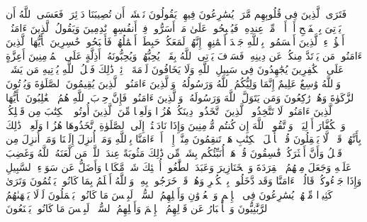 \stopbuffer%
\startbuffer[\q:5:52]
فَتَرَى ٱلَّذِینَ فِی قُلُوبِهِم مَّرَضࣱ یُسَٰرِعُونَ فِیهِمۡ یَقُولُونَ نَخۡشَىٰۤ أَن تُصِیبَنَا دَاۤئِرَةࣱۚ فَعَسَى ٱللَّهُ أَن یَأۡتِیَ بِٱلۡفَتۡحِ أَوۡ أَمۡرࣲ مِّنۡ عِندِهِۦ فَیُصۡبِحُوا۟ عَلَىٰ مَاۤ أَسَرُّوا۟ فِیۤ أَنفُسِهِمۡ نَٰدِمِینَ%
\stopbuffer%
\startbuffer[\q:5:53]
وَیَقُولُ ٱلَّذِینَ ءَامَنُوۤا۟ أَهَٰۤؤُلَاۤءِ ٱلَّذِینَ أَقۡسَمُوا۟ بِٱللَّهِ جَهۡدَ أَیۡمَٰنِهِمۡ إِنَّهُمۡ لَمَعَكُمۡۚ حَبِطَتۡ أَعۡمَٰلُهُمۡ فَأَصۡبَحُوا۟ خَٰسِرِینَ%
\stopbuffer%
\startbuffer[\q:5:54]
یَٰۤأَیُّهَا ٱلَّذِینَ ءَامَنُوا۟ مَن یَرۡتَدَّ مِنكُمۡ عَن دِینِهِۦ فَسَوۡفَ یَأۡتِی ٱللَّهُ بِقَوۡمࣲ یُحِبُّهُمۡ وَیُحِبُّونَهُۥۤ أَذِلَّةٍ عَلَى ٱلۡمُؤۡمِنِینَ أَعِزَّةٍ عَلَى ٱلۡكَٰفِرِینَ یُجَٰهِدُونَ فِی سَبِیلِ ٱللَّهِ وَلَا یَخَافُونَ لَوۡمَةَ لَاۤئِمࣲۚ ذَٰلِكَ فَضۡلُ ٱللَّهِ یُؤۡتِیهِ مَن یَشَاۤءُۚ وَٱللَّهُ وَٰسِعٌ عَلِیمٌ%
\stopbuffer%
\startbuffer[\q:5:55]
إِنَّمَا وَلِیُّكُمُ ٱللَّهُ وَرَسُولُهُۥ وَٱلَّذِینَ ءَامَنُوا۟ ٱلَّذِینَ یُقِیمُونَ ٱلصَّلَوٰةَ وَیُؤۡتُونَ ٱلزَّكَوٰةَ وَهُمۡ رَٰكِعُونَ%
\stopbuffer%
\startbuffer[\q:5:56]
وَمَن یَتَوَلَّ ٱللَّهَ وَرَسُولَهُۥ وَٱلَّذِینَ ءَامَنُوا۟ فَإِنَّ حِزۡبَ ٱللَّهِ هُمُ ٱلۡغَٰلِبُونَ%
\stopbuffer%
\startbuffer[\q:5:57]
یَٰۤأَیُّهَا ٱلَّذِینَ ءَامَنُوا۟ لَا تَتَّخِذُوا۟ ٱلَّذِینَ ٱتَّخَذُوا۟ دِینَكُمۡ هُزُوࣰا وَلَعِبࣰا مِّنَ ٱلَّذِینَ أُوتُوا۟ ٱلۡكِتَٰبَ مِن قَبۡلِكُمۡ وَٱلۡكُفَّارَ أَوۡلِیَاۤءَۚ وَٱتَّقُوا۟ ٱللَّهَ إِن كُنتُم مُّؤۡمِنِینَ%
\stopbuffer%
\startbuffer[\q:5:58]
وَإِذَا نَادَیۡتُمۡ إِلَى ٱلصَّلَوٰةِ ٱتَّخَذُوهَا هُزُوࣰا وَلَعِبࣰاۚ ذَٰلِكَ بِأَنَّهُمۡ قَوۡمࣱ لَّا یَعۡقِلُونَ%
\stopbuffer%
\startbuffer[\q:5:59]
قُلۡ یَٰۤأَهۡلَ ٱلۡكِتَٰبِ هَلۡ تَنقِمُونَ مِنَّاۤ إِلَّاۤ أَنۡ ءَامَنَّا بِٱللَّهِ وَمَاۤ أُنزِلَ إِلَیۡنَا وَمَاۤ أُنزِلَ مِن قَبۡلُ وَأَنَّ أَكۡثَرَكُمۡ فَٰسِقُونَ%
\stopbuffer%
\startbuffer[\q:5:60]
قُلۡ هَلۡ أُنَبِّئُكُم بِشَرࣲّ مِّن ذَٰلِكَ مَثُوبَةً عِندَ ٱللَّهِۚ مَن لَّعَنَهُ ٱللَّهُ وَغَضِبَ عَلَیۡهِ وَجَعَلَ مِنۡهُمُ ٱلۡقِرَدَةَ وَٱلۡخَنَازِیرَ وَعَبَدَ ٱلطَّٰغُوتَۚ أُو۟لَٰۤئِكَ شَرࣱّ مَّكَانࣰا وَأَضَلُّ عَن سَوَاۤءِ ٱلسَّبِیلِ%
\stopbuffer%
\startbuffer[\q:5:61]
وَإِذَا جَاۤءُوكُمۡ قَالُوۤا۟ ءَامَنَّا وَقَد دَّخَلُوا۟ بِٱلۡكُفۡرِ وَهُمۡ قَدۡ خَرَجُوا۟ بِهِۦۚ وَٱللَّهُ أَعۡلَمُ بِمَا كَانُوا۟ یَكۡتُمُونَ%
\stopbuffer%
\startbuffer[\q:5:62]
وَتَرَىٰ كَثِیرࣰا مِّنۡهُمۡ یُسَٰرِعُونَ فِی ٱلۡإِثۡمِ وَٱلۡعُدۡوَٰنِ وَأَكۡلِهِمُ ٱلسُّحۡتَۚ لَبِئۡسَ مَا كَانُوا۟ یَعۡمَلُونَ%
\stopbuffer%
\startbuffer[\q:5:63]
لَوۡلَا یَنۡهَىٰهُمُ ٱلرَّبَّٰنِیُّونَ وَٱلۡأَحۡبَارُ عَن قَوۡلِهِمُ ٱلۡإِثۡمَ وَأَكۡلِهِمُ ٱلسُّحۡتَۚ لَبِئۡسَ مَا كَانُوا۟ یَصۡنَعُونَ%
\stopbuffer%
\startbuffer[\q:5:64]
